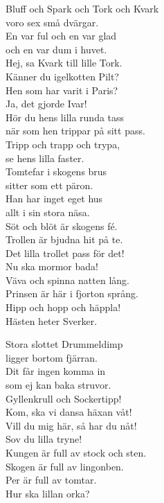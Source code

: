 \documentclass[a6paper,10pt]{article}
\begin{document}
\noindent
{}
\small %

\begin{center}
\end{center}
\begin{lyrics}
Bluff och Spark och Tork och Kvark \\
voro sex små dvärgar. \\
En var ful och en var glad\\ 
och en var dum i huvet.
\vspace{5pt}\\ 
Hej, sa Kvark till lille Tork.\\ 
Känner du igelkotten Pilt?\\
Hen som har varit i Paris? \\
Ja, det gjorde Ivar!
\vspace{5pt}\\
Hör du hens lilla runda tass\\ 
när som hen trippar på sitt pass.\\ 
Tripp och trapp och trypa,\\
se hens lilla faster.
\vspace{5pt}\\ 
Tomtefar i skogens brus\\ 
sitter som ett päron.\\
Han har inget eget hus\\ 
allt i sin stora näsa.
\vspace{5pt}\\ 
Söt och blöt är skogens fé.\\ 
Trollen är bjudna hit på te.\\ 
Det lilla trollet pass för det!\\ 
Nu ska mormor bada!
\vspace{5pt}\\ 
Väva och spinna natten lång.\\ 
Prinsen är här i fjorton språng.\\ 
Hipp och hopp och häppla!\\ 
Hästen heter Sverker.

\newpage
\setlength{\oddsidemargin}{-0.47in}
\noindent
Stora slottet Drummeldimp\\ 
ligger bortom fjärran.\\
Dit får ingen komma in\\ 
som ej kan baka struvor.
\vspace{5pt}\\ 
Gyllenkrull och Sockertipp!\\ 
Kom, ska vi dansa häxan våt!\\ 
Vill du mig här, så har du nåt!\\ 
Sov du lilla tryne!
\vspace{5pt}\\ 
Kungen är full av stock och sten.\\ 
Skogen är full av lingonben.\\ 
Per är full av tomtar.\\ 
Hur ska lillan orka?\\
\end{lyrics}
\end{document}
